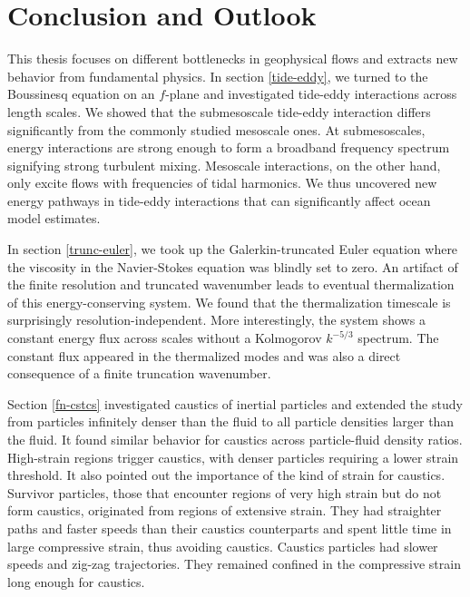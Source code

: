 \documentclass[../Rajarshi-thesis-draft.tex]{subfiles}
\begin{document}
\chapter{Conclusion and Outlook} \label{conc}
This thesis focuses on different bottlenecks in geophysical flows and extracts new behavior from fundamental physics. In section \ref{tide-eddy}, we turned to the Boussinesq equation on an $f$-plane and investigated tide-eddy interactions across length scales. We showed that the submesoscale tide-eddy interaction differs significantly from the commonly studied mesoscale ones. At submesoscales, energy interactions are strong enough to form a broadband frequency spectrum signifying strong turbulent mixing. Mesoscale interactions, on the other hand, only excite flows with frequencies of tidal harmonics. We thus uncovered new energy pathways in tide-eddy interactions that can significantly affect ocean model estimates. 

In section \ref{trunc-euler}, we took up the Galerkin-truncated Euler equation where the viscosity in the Navier-Stokes equation was blindly set to zero. An artifact of the finite resolution and truncated wavenumber leads to eventual thermalization of this energy-conserving system. We found that the thermalization timescale is surprisingly resolution-independent. More interestingly, the system shows a constant energy flux across scales without a Kolmogorov $k^{-5/3}$ spectrum. The constant flux appeared in the thermalized modes and was also a direct consequence of a finite truncation wavenumber.  


Section \ref{fn-cstcs} investigated caustics of inertial particles and extended the study from particles infinitely denser than the fluid to all particle densities larger than the fluid. It found similar behavior for caustics across particle-fluid density ratios. High-strain regions trigger caustics, with denser particles requiring a lower strain threshold. It also pointed out the importance of the kind of strain for caustics. Survivor particles, those that encounter regions of very high strain but do not form caustics, originated from regions of extensive strain. They had straighter paths and faster speeds than their caustics counterparts and spent little time in large compressive strain, thus avoiding caustics. Caustics particles had slower speeds and zig-zag trajectories. They remained confined in the compressive strain long enough for caustics. 
\end{document}
